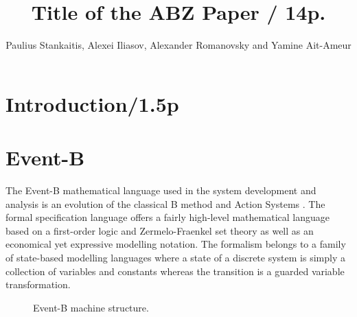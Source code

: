 \documentclass{llncs}
\begin{document}
\title{Title of the ABZ Paper / 14p.}


\author{Paulius Stankaitis, Alexei Iliasov,  Alexander Romanovsky and Yamine Ait-Ameur}


\date{}

\maketitle



\begin{abstract}

\end{abstract}



\section{Introduction/1.5p}


\newpage
\section{Event-B}

The Event-B mathematical language used in the system development and analysis is an evolution of the classical B
method \cite{abrial2005b} and Action Systems \cite{ActionSystems}. %
The formal specification language offers a fairly high-level mathematical language
based on a first-order logic and Zermelo-Fraenkel set theory as well as an economical yet expressive modelling notation.
The formalism belongs to a family of state-based modelling languages where a state of a discrete system is simply a
collection of variables and constants whereas the transition is a guarded variable transformation. 

\begin{figure}[h]
	\footnotesize{
		\centering
	}
	\caption{Event-B machine structure.}
	\label{EventB_structure}
\end{figure}
\end{document}
